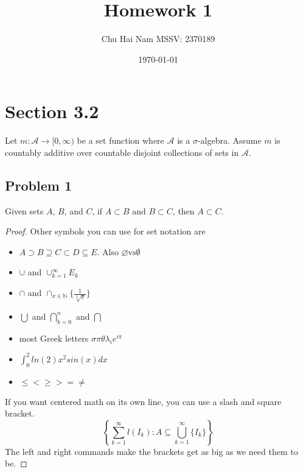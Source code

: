 \documentclass{article}
\title{Homework 1}
\author{Chu Hai Nam MSSV: 2370189}
\date\today
\begin{document}
\maketitle %

\section*{Section 3.2}
Let $m:\mathcal{A}\rightarrow [0,\infty)$ be a set function where $\mathcal{A}$ is a $\sigma$-algebra. Assume $m$ is countably additive over countable disjoint collections of sets in $\mathcal{A}$.

\subsection*{Problem 1}
Given sets $A$, $B$, and $C$, if $A\subset B \textrm{ and } B \subset C$, then $A \subset C$.
\begin{proof}
Other symbols you can use for set notation are
\begin{itemize}
\item$A \supset B \supseteq C \subset D \subseteq E$. Also $\varnothing \textrm{vs} \emptyset$
\item$\cup$ and $\cup_{k=1}^\infty E_k$
\item$\cap$ and $\cap_{x \in \mathbb{N}} \{\frac{1}{\sqrt[3]{x}}\}$
\item$\bigcup$ and $\bigcap\limits_{k=0}^n$ and $\bigcap$
\item most Greek letters $\sigma \pi \theta \lambda_i e^{i\pi}$
\item $\int_0^2 ln(2)x^2sin(x) dx$
\item$\leq < \geq > = \neq$
\end{itemize}
If you want centered math on its own line, you can use a slash and square bracket.\\
\[
\left \{
\sum\limits_{k=1}^\infty l(I_k):A\subseteq \bigcup_{k=1}^\infty \{I_k\}
\right \}
\]
The left and right commands make the brackets get as big as we need them to be.
\end{proof}

\clearpage %
\end{document}
